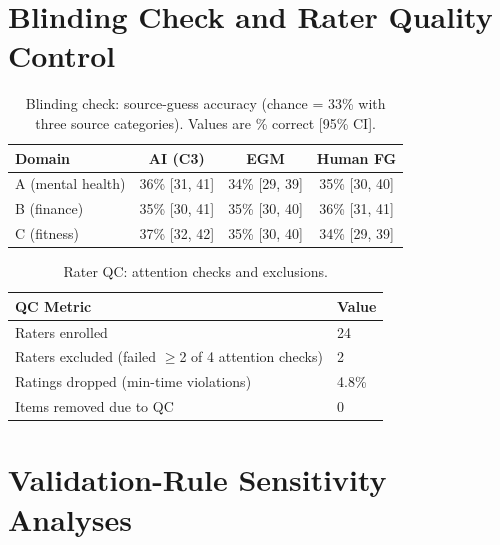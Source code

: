 \documentclass[acmsmall]{acmart}
\begin{document}
\section{Blinding Check and Rater Quality Control}

\begin{table}[h!]
  \centering
  \caption{Blinding check: source-guess accuracy (chance = 33\% with three source categories). Values are \% correct [95\% CI].}
  \label{tab:blinding}
  \small
  \begin{tabular}{@{}lccc@{}}
    \toprule
    \textbf{Domain} & \textbf{AI (C3)} & \textbf{EGM} & \textbf{Human FG} \\
    \midrule
    A (mental health) & 36\% [31, 41] & 34\% [29, 39] & 35\% [30, 40] \\
    B (finance)       & 35\% [30, 41] & 35\% [30, 40] & 36\% [31, 41] \\
    C (fitness)       & 37\% [32, 42] & 35\% [30, 40] & 34\% [29, 39] \\
    \bottomrule
  \end{tabular}
\end{table}

\begin{table}[h!]
  \centering
  \caption{Rater QC: attention checks and exclusions.}
  \label{tab:raterqc}
  \small
  \begin{tabular}{@{}l l@{}}
    \toprule
    \textbf{QC Metric} & \textbf{Value} \\
    \midrule
    Raters enrolled & 24 \\
    Raters excluded (failed $\geq$2 of 4 attention checks) & 2 \\
    Ratings dropped (min-time violations) & 4.8\% \\
    Items removed due to QC & 0 \\
    \bottomrule
  \end{tabular}
\end{table}


\section{Validation-Rule Sensitivity Analyses}
\end{document}
